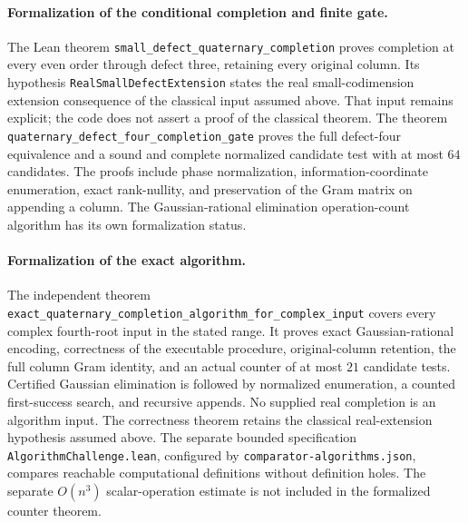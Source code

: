 \paragraph{Formalization of the conditional completion and finite gate.}
The Lean theorem \texttt{small\_defect\_quaternary\_completion} proves completion at every even order through defect three, retaining every original column. Its hypothesis \texttt{RealSmallDefectExtension} states the real small-codimension extension consequence of the classical input assumed above. That input remains explicit; the code does not assert a proof of the classical theorem. The theorem \texttt{quaternary\_defect\_four\_completion\_gate} proves the full defect-four equivalence and a sound and complete normalized candidate test with at most $64$ candidates. The proofs include phase normalization, information-coordinate enumeration, exact rank-nullity, and preservation of the Gram matrix on appending a column. The Gaussian-rational elimination operation-count algorithm has its own formalization status.

\paragraph{Formalization of the exact algorithm.}
The independent theorem \texttt{exact\_\allowbreak quaternary\_\allowbreak completion\_\allowbreak algorithm\_\allowbreak for\_\allowbreak complex\_\allowbreak input} covers every complex fourth-root input in the stated range. It proves exact Gaussian-rational encoding, correctness of the executable procedure, original-column retention, the full column Gram identity, and an actual counter of at most $21$ candidate tests. Certified Gaussian elimination is followed by normalized enumeration, a counted first-success search, and recursive appends. No supplied real completion is an algorithm input. The correctness theorem retains the classical real-extension hypothesis assumed above. The separate bounded specification \texttt{AlgorithmChallenge.lean}, configured by \texttt{comparator-algorithms.json}, compares reachable computational definitions without definition holes. The separate $O(n^3)$ scalar-operation estimate is not included in the formalized counter theorem.

